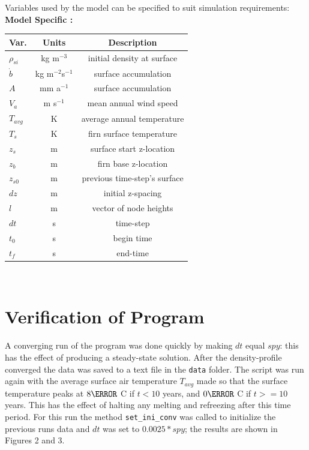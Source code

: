 \documentclass{article}%
\begin{document}
\newpage
\noindent Variables used by the model can be specified to suit simulation requirements:\\

\noindent\textbf{Model Specific :}
\begin{center}
\footnotesize
\noindent\begin{tabular}{lcc}
\hline
Var. & Units & Description\\
\hline
$\rho_{si}$ & kg m$^{-3}$ & initial density at surface\\
$\dot{b}$  & kg m$^{-2}$s$^{-1}$ & surface accumulation\\
$A$  & mm a$^{-1}$ & surface accumulation\\
$V_a$  & m s$^{-1}$ & mean annual wind speed\\
$T_{avg}$ & K & average annual temperature\\
$T_{s}$ & K & firn surface temperature\\
$z_s$ & m & surface start z-location\\
$z_b$ & m & firn base z-location\\
$z_{s0}$ & m & previous time-step's surface\\
$dz$ & m & initial z-spacing\\
$l$ & m & vector of node heights\\
$dt$ & s & time-step\\
$t_0$ & s & begin time\\
$t_f$ & s & end-time\\
\hline
\end{tabular}
\normalsize\\
\end{center}


\section{Verification of Program}

A converging run of the program was done quickly by making $dt$ equal $spy$: this has the effect of producing a steady-state solution.  After the density-profile converged the data was saved to a text file in the \texttt{data} folder.  The script was run again with the average surface air temperature $T_{avg}$ made so   that the surface temperature peaks at $8\degree$ C if $t < 10$ years, and $0\degree$ C if $t >= 10$ years. This has the effect of halting any melting and refreezing after this time period.  For this run the method \texttt{set\_ini\_conv} was called to initialize the previous runs data and $dt$ was set to $0.0025*spy$; the results are shown in Figures 2 and 3.
\end{document}
